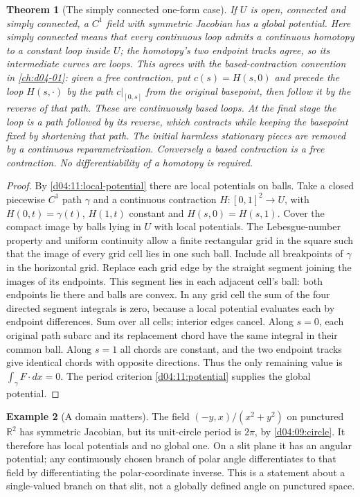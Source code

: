 \documentclass[11pt,oneside,openany]{book}
\newtheorem{theorem}{Theorem}[chapter]
\theoremstyle{definition}
\newtheorem{example}[theorem]{Example}
\theoremstyle{remark}
\newcommand{\R}{\mathbb R}
\begin{document}
\begin{theorem}[The simply connected one-form case]\label{d04:11:simply-connected}
If $U$ is open, connected and simply connected, a $C^1$ field with symmetric
Jacobian has a global potential. Here simply connected means that every
continuous loop admits a continuous homotopy to a constant loop inside
$U$; the homotopy's two endpoint tracks agree, so its intermediate curves
are loops. This agrees with the based-contraction convention in
\cref{ch:d04-01}: given a free contraction, put $c(s)=H(s,0)$ and precede
the loop $H(s,\cdot)$ by the path $c|_{[0,s]}$ from the original basepoint,
then follow it by the reverse of that path. These are continuously based
loops. At the final stage the loop is a path followed by its reverse,
which contracts while keeping the basepoint fixed by shortening that path.
The initial harmless stationary pieces are removed by a continuous
reparametrization. Conversely a based contraction is a free contraction.
No differentiability of a homotopy is required.
\end{theorem}
\begin{proof}
By \cref{d04:11:local-potential} there are local potentials on balls.
Take a closed piecewise $C^1$ path $\gamma$ and a continuous contraction
$H:[0,1]^2\to U$, with $H(0,t)=\gamma(t)$, $H(1,t)$ constant and
$H(s,0)=H(s,1)$. Cover the compact image by balls lying in $U$ with local
potentials. The Lebesgue-number property and uniform continuity allow a
finite rectangular grid in the square such that the image of every grid
cell lies in one such ball. Include all breakpoints of $\gamma$ in the
horizontal grid. Replace each grid edge by the straight segment joining
the images of its endpoints. This segment lies in each adjacent cell's
ball: both endpoints lie there and balls are convex. In any grid cell the
sum of the four directed segment integrals is zero, because a local
potential evaluates each by endpoint differences. Sum over all cells;
interior edges cancel. Along $s=0$, each original path subarc and its
replacement chord have the same integral in their common ball. Along
$s=1$ all chords are constant, and the two endpoint tracks give identical
chords with opposite directions. Thus the only remaining value is
$\int_\gamma F\cdot dx=0$. The period criterion
\cref{d04:11:potential} supplies the global potential.
\end{proof}

\begin{example}[A domain matters]\label{d04:11:angular-obstruction}
The field $(-y,x)/(x^2+y^2)$ on punctured $\R^2$ has symmetric Jacobian,
but its unit-circle period is $2\pi$, by \cref{d04:09:circle}. It therefore
has local potentials and no global one. On a slit plane it has an angular
potential; any continuously chosen branch of polar angle differentiates to
that field by differentiating the polar-coordinate inverse. This is a
statement about a single-valued branch on that slit, not a globally defined
angle on punctured space.
\end{example}
\end{document}
